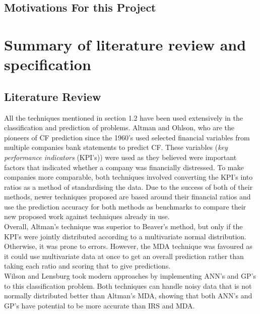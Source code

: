 \documentclass[11pt]{article}
\begin{document}
\subsection{Motivations For this Project}
\newpage
\section{Summary of literature review and specification}\label{sec:spec}
\subsection{Literature Review}
All the techniques mentioned in section 1.2 have been used extensively in the classification and prediction of problems. Altman and Ohlson, who are the pioneers of CF prediction since the 1960's used selected financial variables from multiple companies bank statements to predict CF. These variables (\textit{key performance indicators} (KPI's)) were used as they believed were important factors that indicated whether a company was financially distressed. To make companies more comparable, both techniques involved converting the KPI's into ratios as a method of standardising the data. Due to the success of both of their methods, newer techniques proposed are based around their financial ratios and use the prediction accuracy for both methods as benchmarks to compare their new proposed work against techniques already in use. \\

Overall, Altman's technique was superior to Beaver's method, but only if the KPI's were jointly distributed according to a multivariate normal distribution. Otherwise, it was prone to errors. However, the MDA technique was favoured as it could use multivariate data at once to get an overall prediction rather than taking each ratio and scoring that to give predictions. \\
Wilson and Lensburg took modern approaches by implementing ANN's and GP's to this classification problem. Both techniques can handle noisy data that is not normally distributed better than Altman's MDA, showing that both ANN's and GP's have potential to be more accurate than IRS and MDA. 
\end{document}
